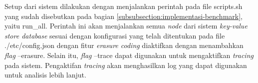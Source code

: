 Setup dari sistem dilakukan dengan menjalankan perintah pada file scripts.sh yang sudah disebutkan pada bagian \ref{subsubsection:implementasi-benchmark}, yaitu run\_all. Perintah ini akan menjalankan semua \textit{node} dari sistem \textit{key-value store database} sesuai dengan konfigurasi yang telah ditentukan pada file ./etc/config.json dengan fitur \textit{erasure coding} diaktifkan dengan menambahkan \textit{flag} --erasure. Selain itu, \textit{flag} --trace dapat digunakan untuk mengaktifkan \textit{tracing} pada sistem. Pengaktifan \textit{tracing} akan menghasilkan log yang dapat digunakan untuk analisis lebih lanjut.
